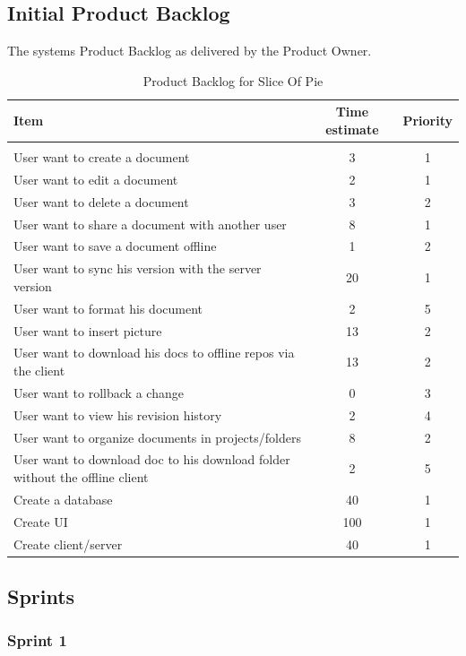 \documentclass[a4paper,11pt,report]{report}
\begin{document}
	\subsection{Initial Product Backlog}
		The systems Product Backlog as delivered by the Product Owner.
  \begin{center}

		\begin{table}[H]
		\caption{Product Backlog for Slice Of Pie}
		\begin{tabular}{l c c}
		\hline \hline
		Item & Time estimate & Priority
		\\ \hline
		\\ User want to create a document & 3 & 1
		\\ User want to edit a document & 2 & 1
		\\ User want to delete a document & 3 & 2
		\\ User want to share a document with another user & 8 & 1
		\\ User want to save a document offline & 1 & 2
		\\ User want to sync his version with the server version & 20 & 1
		\\ User want to format his document & 2 & 5
		\\ User want to insert picture & 13 & 2
		\\ User want to download his docs to offline repos via the client & 13 & 2
		\\ User want to rollback a change & 0 & 3
		\\ User want to view his revision history & 2 & 4
		\\ User want to organize documents in projects/folders & 8 & 2
		\\ User want to download doc to his download folder without the offline client & 2 & 5
		\\ Create a database & 40 & 1
		\\ Create UI & 100 & 1
		\\ Create client/server & 40 & 1
  	 	\end{tabular}
		\end{table}
  \end{center}
	\subsection{Sprints}
		\subsubsection{Sprint 1}
\end{document}
